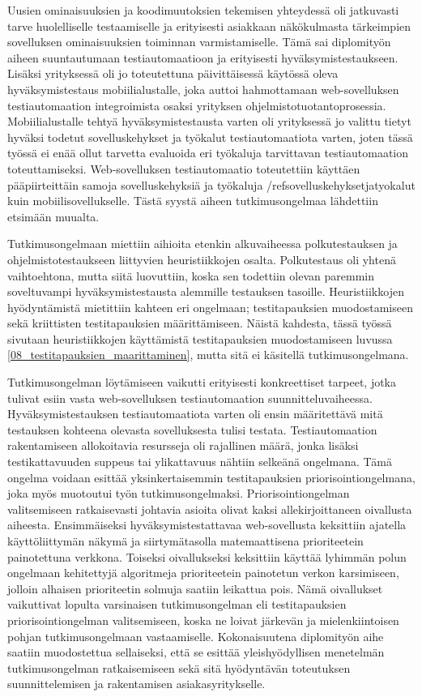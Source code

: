Uusien ominaisuuksien ja koodimuutoksien tekemisen yhteydessä oli jatkuvasti tarve huolelliselle testaamiselle ja erityisesti asiakkaan näkökulmasta tärkeimpien sovelluksen ominaisuuksien toiminnan varmistamiselle.
Tämä sai diplomityön aiheen suuntautumaan testiautomaatioon ja erityisesti hyväksymistestaukseen.
Lisäksi yrityksessä oli jo toteutettuna päivittäisessä käytössä oleva hyväksymistestaus mobiilialustalle, joka auttoi hahmottamaan web-sovelluksen testiautomaation integroimista osaksi yrityksen ohjelmistotuotantoprosessia.
Mobiilialustalle tehtyä hyväksymistestausta varten oli yrityksessä jo valittu tietyt hyväksi todetut sovelluskehykset ja työkalut testiautomaatiota varten, joten tässä työssä ei enää ollut tarvetta evaluoida eri työkaluja tarvittavan testiautomaation toteuttamiseksi.
Web-sovelluksen testiautomaatio toteutettiin käyttäen pääpiirteittäin samoja sovelluskehyksiä ja työkaluja /ref{sovelluskehyksetjatyokalut} kuin mobiilisovellukselle.
Tästä syystä aiheen tutkimusongelmaa lähdettiin etsimään muualta.

Tutkimusongelmaan miettiin aihioita etenkin alkuvaiheessa polkutestauksen ja ohjelmistotestaukseen liittyvien heuristiikkojen osalta.
Polkutestaus oli yhtenä vaihtoehtona, mutta siitä luovuttiin, koska sen todettiin olevan paremmin soveltuvampi hyväksymistestausta alemmille testauksen tasoille.
Heuristiikkojen hyödyntämistä mietittiin kahteen eri ongelmaan; testitapauksien muodostamiseen sekä kriittisten testitapauksien määrittämiseen.
Näistä kahdesta, tässä työssä sivutaan heuristiikkojen käyttämistä testitapauksien muodostamiseen luvussa \ref{08_testitapauksien_maarittaminen}, mutta sitä ei käsitellä tutkimusongelmana.

Tutkimusongelman löytämiseen vaikutti erityisesti konkreettiset tarpeet, jotka tulivat esiin vasta web-sovelluksen testiautomaation suunnitteluvaiheessa.
Hyväksymistestauksen testiautomaatiota varten oli ensin määritettävä mitä testauksen kohteena olevasta sovelluksesta tulisi testata.
Testiautomaation rakentamiseen allokoitavia resursseja oli rajallinen määrä, jonka lisäksi testikattavuuden suppeus tai ylikattavuus nähtiin selkeänä ongelmana.
Tämä ongelma voidaan esittää yksinkertaisemmin testitapauksien priorisointiongelmana, joka myös muotoutui työn tutkimusongelmaksi.
Priorisointiongelman valitsemiseen ratkaisevasti johtavia asioita olivat kaksi allekirjoittaneen oivallusta aiheesta.
Ensimmäiseksi hyväksymistestattavaa web-sovellusta keksittiin ajatella käyttöliittymän näkymä ja siirtymätasolla matemaattisena prioriteetein painotettuna verkkona.
Toiseksi oivallukseksi keksittiin käyttää lyhimmän polun ongelmaan kehitettyjä algoritmeja prioriteetein painotetun verkon karsimiseen, jolloin alhaisen prioriteetin solmuja saatiin leikattua pois.
Nämä oivallukset vaikuttivat lopulta varsinaisen tutkimusongelman eli testitapauksien priorisointiongelman valitsemiseen, koska ne loivat järkevän ja mielenkiintoisen pohjan tutkimusongelmaan vastaamiselle.
Kokonaisuutena diplomityön aihe saatiin muodostettua sellaiseksi, että se esittää yleishyödyllisen menetelmän tutkimusongelman ratkaisemiseen sekä sitä hyödyntävän toteutuksen suunnittelemisen ja rakentamisen asiakasyritykselle.

